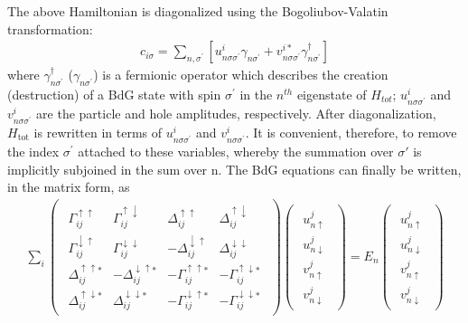 \documentclass[aps,prl,reprint,nobibnotes]{revtex4-1}
\begin{document}
The above Hamiltonian is diagonalized using the Bogoliubov-Valatin transformation:
\begin{align}
c_{i\sigma}=\sum_{n,\sigma^{\prime}} \left[ u_{n\sigma \sigma^{\prime}}^{i} \gamma_{n\sigma^{\prime}} + v_{n\sigma \sigma^{\prime}}^{i*} \gamma_{n\sigma^{\prime}}^{\dagger} \right]
\label{bdg_trans}
\end{align}
where  $\gamma_{n\sigma^{\prime}}^{\dagger}$ ($\gamma_{n\sigma^{\prime}}$) is a fermionic operator which describes the creation (destruction) of a BdG state with spin $\sigma^{\prime}$ in the $n^{th}$ eigenstate of $H_{tot}$; $u_{n\sigma\sigma^{\prime}}^i$ and $v_{n\sigma\sigma^{\prime}}^i$ are the particle and hole amplitudes, respectively. After diagonalization, $H_{\text{tot}}$ is rewritten in terms of $u_{n\sigma\sigma^{\prime}}^i$ and $v_{n\sigma\sigma^{\prime}}^i$. It is convenient, therefore, to remove the index $\sigma^{\prime}$ attached to these variables, whereby the summation over $\sigma'$ is implicitly subjoined in the sum over n. The BdG equations can finally be written, in the matrix form, as
\begin{align}
\sum_i \begin{pmatrix} \begin{array}{cccc} \Gamma_{ij}^{\uparrow\uparrow} & \Gamma_{ij}^{\uparrow\downarrow} & \Delta_{ij}^{\uparrow \uparrow} & \Delta_{ij}^{\uparrow \downarrow} \\ \Gamma_{ij}^{\downarrow\uparrow} & \Gamma_{ij}^{\downarrow\downarrow} & -\Delta_{ij}^{\downarrow \uparrow} & \Delta_{ij}^{\downarrow \downarrow} \\ \Delta_{ij}^{\uparrow \uparrow *} & -\Delta_{ij}^{\downarrow \uparrow*} & -\Gamma_{ij}^{\uparrow\uparrow *} & -\Gamma_{ij}^{\uparrow\downarrow *}\\\Delta_{ij}^{\uparrow \downarrow*} & \Delta_{ij}^{\downarrow \downarrow *} & -\Gamma_{ij}^{\downarrow\uparrow *} & -\Gamma_{ij}^{\downarrow\downarrow *}\end{array} \end{pmatrix}
\begin{pmatrix} \begin{array}{c} u_{n\uparrow}^j \\ u_{n\downarrow}^j \\ v_{n\uparrow}^j \\ v_{n\downarrow}^j \end{array} \end{pmatrix}=E_n \begin{pmatrix} \begin{array}{c} u_{n\uparrow}^j \\ u_{n\downarrow}^j \\ v_{n\uparrow}^j \\ v_{n\downarrow}^j \end{array} \end{pmatrix}
\label{BdG_eq}
\end{align}
\end{document}
